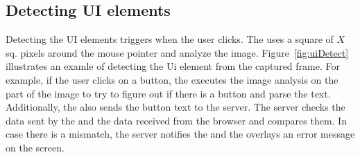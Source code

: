 
\subsection{Detecting UI elements}

Detecting the UI elements triggers when the user clicks. The \device uses a square of $X$ sq. pixels around the mouse pointer and analyze the image. Figure~\ref{fig:uiDetect} illustrates an examle of detecting the Ui element from the captured frame. For example, if the user clicks on a button, the \device executes the image analysis on the part of the image to try to figure out if there is a button and parse the text. Additionally, the \device also sends the button text to the server. The server checks the data sent by the \device and the data received from the browser and compares them. In case there is a mismatch, the server notifies the \device and the \device overlays an error message on the screen. 


